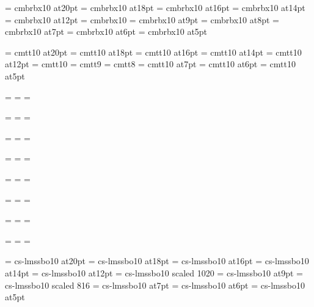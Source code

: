 \font\twentybf=     cmbrbx10 at20pt
\font\eighteenbf=   cmbrbx10 at18pt
\font\sixteenbf=    cmbrbx10 at16pt
\font\fourteenbf=   cmbrbx10 at14pt
\font\twelvebf=     cmbrbx10 at12pt
\font\tenbf=        cmbrbx10
\font\ninebf=       cmbrbx10 at9pt
\font\eightbf=      cmbrbx10 at8pt
\font\sevenbf=      cmbrbx10 at7pt
\font\sixbf=        cmbrbx10 at6pt
\font\fivebf=       cmbrbx10 at5pt

\font\twentytt=     cmtt10 at20pt
\font\eighteentt=   cmtt10 at18pt
\font\sixteentt=    cmtt10 at16pt
\font\fourteentt=   cmtt10 at14pt
\font\twelvett=     cmtt10 at12pt
\font\tentt=        cmtt10
\font\ninett=       cmtt9
\font\eighttt=      cmtt8
\font\seventt=      cmtt10 at7pt
\font\sixtt=        cmtt10 at6pt
\font\fivett=       cmtt10 at5pt




=\tenrm
{}=\sevenrm
{}=\fiverm
\def\rm{\fam=0 \tenrm}

=\teni
{}=\seveni
{}=\fivei
\def\mit{\fam=1}

=\tensy
{}=\sevensy
{}=\fivesy
\def\cal{\fam=2}

=\tenex
{}=\sevenex
{}=\fiveex


\def\it{\fam=\itfam \tenit}
\textfont\itfam=\tenit
\scriptfont\itfam=\sevenit
\scriptscriptfont\itfam=\fiveit

\def\sl{\fam=\slfam \tensl}
\textfont\slfam=\tensl
\scriptfont\slfam=\sevensl
\scriptscriptfont\slfam=\fivesl

\def\bf{\fam=\bffam \tenbf}
\textfont\bffam=\tenbf
\scriptfont\bffam=\sevenbf
\scriptscriptfont\bffam=\fivebf

\def\tt{\fam=\ttfam \tentt}
\textfont\ttfam=\tentt
\scriptfont\ttfam=\seventt
\scriptscriptfont\ttfam=\fivett


\font\twentyitbf=      cs-lmssbo10 at20pt
\font\eighteenitbf=    cs-lmssbo10 at18pt
\font\sixteenitbf=     cs-lmssbo10 at16pt
\font\fourteenitbf=    cs-lmssbo10 at14pt
\font\twelveitbf=      cs-lmssbo10 at12pt
\font\itbf=            cs-lmssbo10 scaled 1020       \itbf=3pt %
\font\nineitbf=        cs-lmssbo10 at9pt
\font\eightitbf=       cs-lmssbo10 scaled 816       \eightitbf=2.5pt
\font\sevenitbf=       cs-lmssbo10 at7pt
\font\sixitbf=         cs-lmssbo10 at6pt
\font\fiveitbf=        cs-lmssbo10 at5pt


